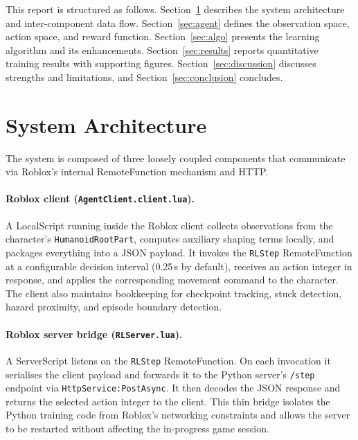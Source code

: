 \documentclass[11pt]{article}
\begin{document}
This report is structured as follows. Section~\ref{sec:arch} describes
the system architecture and inter-component data flow. Section~\ref{sec:agent}
defines the observation space, action space, and reward function.
Section~\ref{sec:algo} presents the learning algorithm and its
enhancements. Section~\ref{sec:results} reports quantitative training
results with supporting figures. Section~\ref{sec:discussion} discusses
strengths and limitations, and Section~\ref{sec:conclusion} concludes.

\section{System Architecture}
\label{sec:arch}

The system is composed of three loosely coupled components that
communicate via Roblox's internal RemoteFunction mechanism and HTTP.

\paragraph{Roblox client (\texttt{AgentClient.client.lua}).}
A LocalScript running inside the Roblox client collects observations from
the character's \texttt{HumanoidRootPart}, computes auxiliary shaping
terms locally, and packages everything into a JSON payload. It invokes
the \texttt{RLStep} RemoteFunction at a configurable decision interval
(0.25\,s by default), receives an action integer in response, and applies
the corresponding movement command to the character. The client also
maintains bookkeeping for checkpoint tracking, stuck detection, hazard
proximity, and episode boundary detection.

\paragraph{Roblox server bridge (\texttt{RLServer.lua}).}
A ServerScript listens on the \texttt{RLStep} RemoteFunction. On each
invocation it serialises the client payload and forwards it to the Python
server's \texttt{/step} endpoint via \texttt{HttpService:PostAsync}.
It then decodes the JSON response and returns the selected action integer
to the client. This thin bridge isolates the Python training code from
Roblox's networking constraints and allows the server to be restarted
without affecting the in-progress game session.
\end{document}
